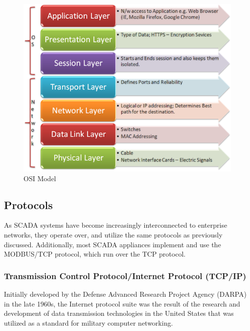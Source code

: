 \documentclass[11pt,]{article}
\begin{document}
\begin{figure}

{\centering \includegraphics{thesis_files/figure-latex/unnamed-chunk-5-1} 

}

\caption{OSI Model}\label{fig:unnamed-chunk-5}
\end{figure}

\subsection{Protocols}\label{protocols}

As SCADA systems have become increasingly interconnected to enterprise
networks, they operate over, and utilize the same protocols as
previously discussed. Additionally, most SCADA appliances implement and
use the MODBUS/TCP protocol, which run over the TCP protocol.

\subsubsection{Transmission Control Protocol/Internet Protocol
(TCP/IP)}\label{transmission-control-protocolinternet-protocol-tcpip}

Initially developed by the Defense Advanced Research Project Agency
(DARPA) in the late 1960s, the Internet protocol suite was the result of
the research and development of data transmission technologies in the
United States that was utilized as a standard for military computer
networking.
\end{document}
